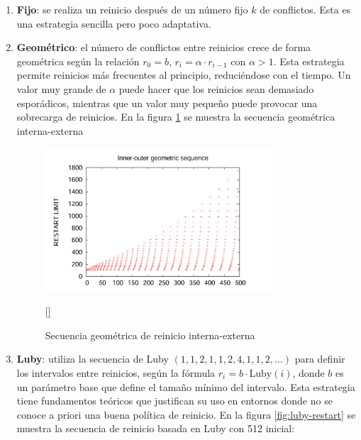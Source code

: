 \begin{enumerate}
    \item \textbf{Fijo}: se realiza un reinicio después de un número fijo $k$ de conflictos. Esta es una estrategia sencilla pero poco adaptativa.

    \item \textbf{Geométrico}: el número de conflictos entre reinicios crece de forma geométrica según la relación $r_0 = b$, $r_i = \alpha \cdot r_{i-1}$ con $\alpha > 1$. Esta estrategia permite reinicios más frecuentes al principio, reduciéndose con el tiempo. Un valor muy grande de $\alpha$ puede hacer que los reinicios sean demasiado esporádicos, mientras que un valor muy pequeño puede provocar una sobrecarga de reinicios. En la figura \ref{fig:geom-restart} se muestra la secuencia geométrica interna-externa
    
    \begin{figure}[ht]
        \centering
        \includegraphics[width=0.8\textwidth]{Graphics/geom_restart.png}
        \caption{Secuencia geom\'etrica de reinicio interna-externa}
        [\cite{oliveras2009dpll_cdcl}]
        \label{fig:geom-restart}
    \end{figure}

    \item \textbf{Luby}: utiliza la secuencia de Luby $(1,1,2,1,1,2,4,1,1,2,\dots)$ para definir los intervalos entre reinicios, según la fórmula $r_i = b \cdot \text{Luby}(i)$, donde $b$ es un parámetro base que define el tamaño mínimo del intervalo. Esta estrategia tiene fundamentos teóricos que justifican su uso en entornos donde no se conoce a priori una buena política de reinicio. En la figura \ref{fig:luby-restart} se muestra la secuencia de reinicio basada en Luby con 512 inicial:
    

\end{enumerate}
